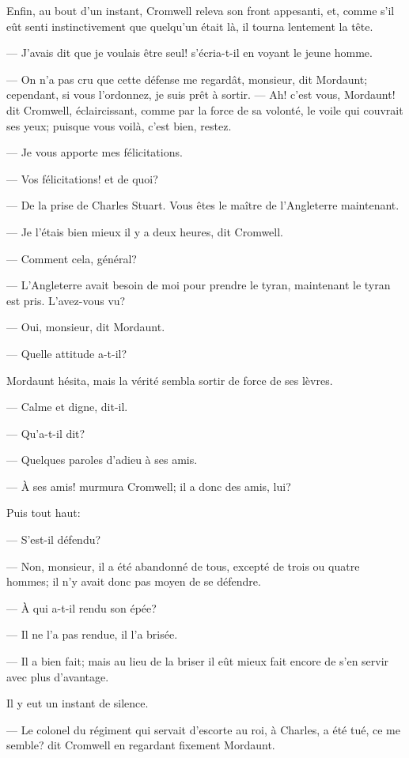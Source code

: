 Enfin, au bout d'un instant, Cromwell releva son front appesanti, et, comme s'il eût senti instinctivement que quelqu'un était là, il tourna lentement la tête.

— J'avais dit que je voulais être seul! s'écria-t-il en voyant le jeune homme.

— On n'a pas cru que cette défense me regardât, monsieur, dit Mordaunt; cependant, si vous l'ordonnez, je suis prêt à sortir.
— Ah! c'est vous, Mordaunt! dit Cromwell, éclaircissant, comme par la force de sa volonté, le voile qui couvrait ses yeux; puisque vous voilà, c'est bien, restez.

— Je vous apporte mes félicitations.

— Vos félicitations! et de quoi?

— De la prise de Charles Stuart. Vous êtes le maître de l'Angleterre maintenant.

— Je l'étais bien mieux il y a deux heures, dit Cromwell.

— Comment cela, général?

— L'Angleterre avait besoin de moi pour prendre le tyran, maintenant le tyran est pris. L'avez-vous vu?

— Oui, monsieur, dit Mordaunt.

— Quelle attitude a-t-il?

Mordaunt hésita, mais la vérité sembla sortir de force de ses lèvres.

— Calme et digne, dit-il.

— Qu'a-t-il dit?

— Quelques paroles d'adieu à ses amis.

— À ses amis! murmura Cromwell; il a donc des amis, lui?

Puis tout haut:

— S'est-il défendu?

— Non, monsieur, il a été abandonné de tous, excepté de trois ou quatre hommes; il n'y avait donc pas moyen de se défendre.

— À qui a-t-il rendu son épée?

— Il ne l'a pas rendue, il l'a brisée.

— Il a bien fait; mais au lieu de la briser il eût mieux fait encore de s'en servir avec plus d'avantage.

Il y eut un instant de silence.

— Le colonel du régiment qui servait d'escorte au roi, à Charles, a été tué, ce me semble? dit Cromwell en regardant fixement Mordaunt.

